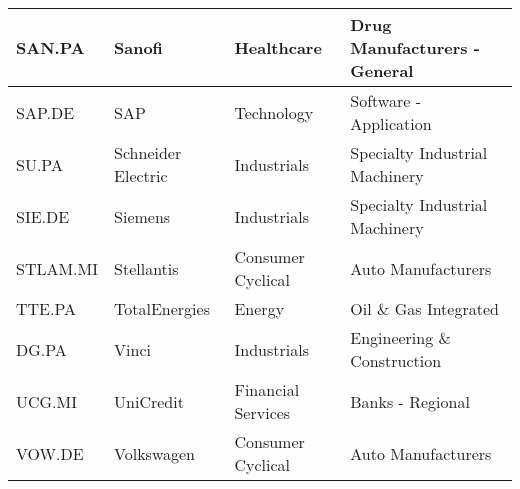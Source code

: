 \begin{longtable}{|p{2cm}|p{3cm}|p{4cm}|p{4cm}|}
SAN.PA & Sanofi & Healthcare & Drug Manufacturers - General \\ \hline
SAP.DE & SAP & Technology & Software - Application \\ \hline
SU.PA & Schneider Electric & Industrials & Specialty Industrial Machinery \\ \hline
SIE.DE & Siemens & Industrials & Specialty Industrial Machinery \\ \hline
STLAM.MI & Stellantis & Consumer Cyclical & Auto Manufacturers \\ \hline
TTE.PA & TotalEnergies & Energy & Oil \& Gas Integrated \\ \hline
DG.PA & Vinci & Industrials & Engineering \& Construction \\ \hline
UCG.MI & UniCredit & Financial Services & Banks - Regional \\ \hline
VOW.DE & Volkswagen & Consumer Cyclical & Auto Manufacturers \\ \hline
\end{longtable}
